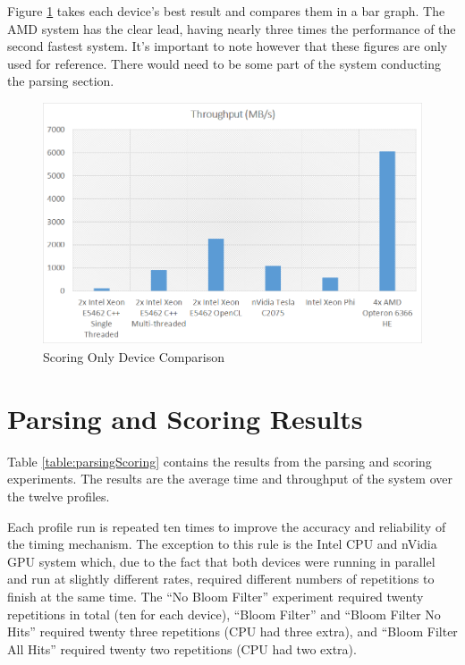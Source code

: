 Figure \ref{fig:scoringOnlyBest} takes each device's best result and compares
them in a bar graph. The AMD system has the clear lead, having nearly three
times the performance of the second fastest system. It's important to note
however that these figures are only used for reference. There would need to
be some part of the system conducting the parsing section.

\begin{figure}[H]
\centering
\includegraphics[width=\linewidth]{images/scoringOnlyBest.png}
\caption{Scoring Only Device Comparison}
\label{fig:scoringOnlyBest}
\end{figure}

\section{Parsing and Scoring Results}

Table \ref{table:parsingScoring} contains the results from the parsing and
scoring experiments. The results are the average time and throughput of the
system over the twelve profiles.

Each profile run is repeated ten times to improve the accuracy and reliability
of the timing mechanism. The exception to this rule is the Intel CPU and nVidia
GPU system which, due to the fact that both devices were running in parallel and
run at slightly different rates, required different numbers of repetitions to
finish at the same time. The ``No Bloom Filter'' experiment required twenty
repetitions in total (ten for each device), ``Bloom Filter'' and ``Bloom Filter
No Hits'' required twenty three repetitions (CPU had three extra), and ``Bloom
Filter All Hits'' required twenty two repetitions (CPU had two extra).

